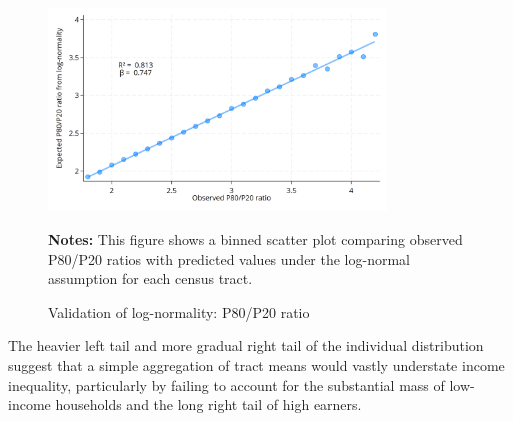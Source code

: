 \begin{figure}[H]
\begin{center}
\captionsetup{justification=centering}
\caption{Validation of log-normality: P80/P20 ratio}
\label{fig:p80p20}
\includegraphics[width=0.8\textwidth]{output/binned_scatter_p80p20.png}
\end{center}
\begin{fignotes2}
\textbf{Notes:} This figure shows a binned scatter plot comparing observed P80/P20 ratios with predicted values under the log-normal assumption for each census tract.
\end{fignotes2}
\end{figure}

\newpage

The heavier left tail and more gradual right tail of the individual distribution suggest that a simple aggregation of tract means would vastly understate income inequality, particularly by failing to account for the substantial mass of low-income households and the long right tail of high earners.

